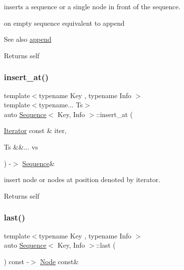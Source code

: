 inserts a sequence or a single node in front of the sequence. 

on empty sequence equivalent to append \begin{DoxySeeAlso}{See also}
\mbox{\hyperlink{structSequence_a64bd7f922b3cbf1dbb231f322ea4550b}{append}} 
\end{DoxySeeAlso}
\begin{DoxyReturn}{Returns}
self 
\end{DoxyReturn}
\mbox{\label{structSequence_a3018160acb26652616019865aff91dde}} 
\subsubsection{\texorpdfstring{insert\_at()}{insert\_at()}}
{\footnotesize\ttfamily template$<$typename Key , typename Info $>$ \\
template$<$typename... Ts$>$ \\
auto \mbox{\hyperlink{structSequence}{Sequence}}$<$ Key, Info $>$\+::insert\+\_\+at (\begin{DoxyParamCaption}\item[{\mbox{\hyperlink{structSequence_1_1Iterator}{Iterator}} const \&}]{iter,  }\item[{Ts \&\&...}]{vs }\end{DoxyParamCaption}) -\/$>$ \mbox{\hyperlink{structSequence}{Sequence}}\& \hspace{0.3cm}{\ttfamily [inline]}}



insert node or nodes at position denoted by iterator. 

\begin{DoxyReturn}{Returns}
self 
\end{DoxyReturn}
\mbox{\label{structSequence_a236403b837ccd3e7c42ee880809ee7bd}} 
\subsubsection{\texorpdfstring{last()}{last()}\hspace{0.1cm}{\footnotesize\ttfamily [1/2]}}
{\footnotesize\ttfamily template$<$typename Key , typename Info $>$ \\
auto \mbox{\hyperlink{structSequence}{Sequence}}$<$ Key, Info $>$\+::last (\begin{DoxyParamCaption}{ }\end{DoxyParamCaption}) const -\/$>$ \mbox{\hyperlink{structSequence_1_1Node}{Node}} const\& \hspace{0.3cm}{\ttfamily [inline]}}



